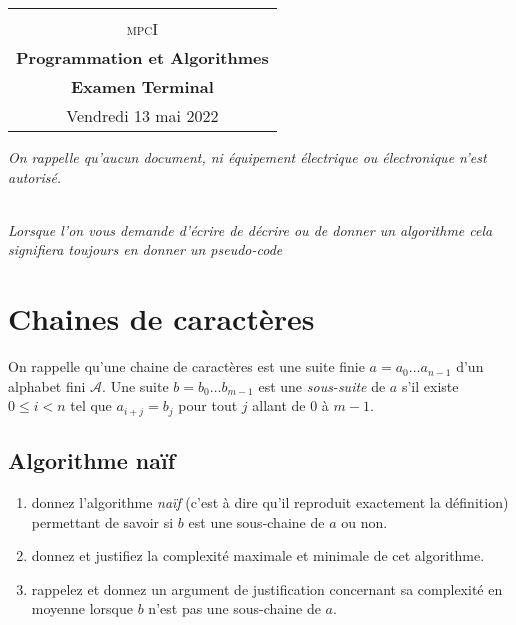 \documentclass
[12pt]
{article}
\begin{document}
\begin{center}
  \begin{tabular}{c}
  \hline\\%
  {\textsc{mpc\Large{I}}}\vspace{0.1cm}
  \\
%  
    {\bf \Large \sc Programmation et Algorithmes} \\ 
    \vspace*{.2cm}
    {\bf Examen Terminal} \\
    {\footnotesize Vendredi 13 mai 2022}\\
    \hline
  \end{tabular}
\end{center}
\vspace{0.6cm}
%
%
\begin{center}
{\em On rappelle qu'aucun document, ni équipement électrique ou électronique n'est autorisé. }

~\\

{\em Lorsque l'on vous demande d'écrire de décrire ou de donner un algorithme cela signifiera toujours en donner un pseudo-code}

\end{center}

\section{Chaines de caractères}

On rappelle qu'une chaine de caractères est une suite finie $a = a_0\dots a_{n-1}$ d'un alphabet fini $\mathcal{A}$. Une suite $b=b_0\dots b_{m-1}$ est une {\em sous-suite} de $a$ s'il existe $0 \leq i < n$ tel que $a_{i + j} = b_j$ pour tout $j$ allant de $0$ à $m-1$.

\subsection{Algorithme naïf\label{naif}}

\begin{enumerate}
    \item donnez l'algorithme {\em naïf} (c'est à dire qu'il reproduit exactement la définition) permettant de savoir si $b$ est une sous-chaine de $a$ ou non.
    \item donnez et justifiez la complexité maximale et minimale de cet algorithme.
    \item rappelez et donnez un argument de justification concernant sa complexité en moyenne lorsque $b$ n'est pas une sous-chaine de $a$.
\end{enumerate}
\end{document}

